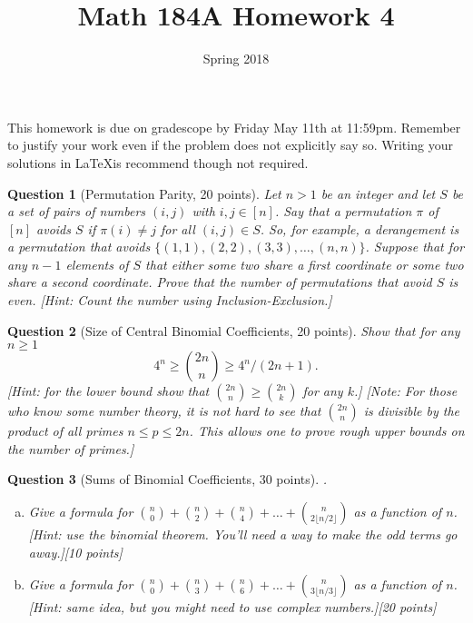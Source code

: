 \documentclass{article}
\title{Math 184A Homework 4}
\date{Spring 2018}
\newtheorem{ques}{Question}
\begin{document}
\maketitle

This homework is due on gradescope by Friday May 11th at 11:59pm. Remember to justify your work even if the problem does not explicitly say so. Writing your solutions in \LaTeX is recommend though not required.

\begin{ques}[Permutation Parity, 20 points]
Let $n>1$ be an integer and let $S$ be a set of pairs of numbers $(i,j)$ with $i,j\in [n]$. Say that a permutation $\pi$ of $[n]$ avoids $S$ if $\pi(i)\neq j$ for all $(i,j)\in S$. So, for example, a derangement is a permutation that avoids $\{(1,1),(2,2),(3,3),\ldots,(n,n)\}$. Suppose that for any $n-1$ elements of $S$ that either some two share a first coordinate or some two share a second coordinate. Prove that the number of permutations that avoid $S$ is even. [Hint: Count the number using Inclusion-Exclusion.]
\end{ques}

\begin{ques}[Size of Central Binomial Coefficients, 20 points]
Show that for any $n\geq 1$
$$
4^n \geq \binom{2n}{n} \geq 4^n/(2n+1).
$$
[Hint: for the lower bound show that $\binom{2n}{n}\geq \binom{2n}{k}$ for any $k$.] [Note: For those who know some number theory, it is not hard to see that $\binom{2n}{n}$ is divisible by the product of all primes $n\leq p\leq 2n$. This allows one to prove rough upper bounds on the number of primes.]
\end{ques}

\begin{ques}[Sums of Binomial Coefficients, 30 points].\\
\begin{enumerate}[(a)]
\item Give a formula for $\binom{n}{0}+\binom{n}{2}+\binom{n}{4}+\ldots+\binom{n}{2\lfloor n/2 \rfloor}$ as a function of $n$. [Hint: use the binomial theorem. You'll need a way to make the odd terms go away.][10 points]
\item Give a formula for $\binom{n}{0}+\binom{n}{3}+\binom{n}{6}+\ldots+\binom{n}{3\lfloor n/3 \rfloor}$ as a function of $n$. [Hint: same idea, but you might need to use complex numbers.][20 points]
\end{enumerate}
\end{ques}
\end{document}
